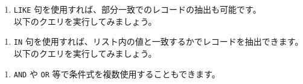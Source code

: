 \begin{enumerate}
\def\labelenumi{\arabic{enumi}.}
\setcounter{enumi}{2}
\tightlist
\item
  \texttt{LIKE} 句を使用すれば、部分一致でのレコードの抽出も可能です。\\
  以下のクエリを実行してみましょう。
\end{enumerate}

\begin{Shaded}
\begin{Highlighting}[]
 \OperatorTok{*}  \NormalTok{;}

\NormalTok{\# }\OperatorTok{{-}\textgreater{}}
\end{Highlighting}
\end{Shaded}

\begin{enumerate}
\def\labelenumi{\arabic{enumi}.}
\setcounter{enumi}{3}
\tightlist
\item
  \texttt{IN}
  句を使用すれば、リスト内の値と一致するかでレコードを抽出できます。
  以下のクエリを実行してみましょう。
\end{enumerate}

\begin{Shaded}
\begin{Highlighting}[]
 \OperatorTok{*} \NormalTok{ (}\NormalTok{, }\NormalTok{);}

\NormalTok{\# }\OperatorTok{{-}\textgreater{}}
\end{Highlighting}
\end{Shaded}

\begin{enumerate}
\def\labelenumi{\arabic{enumi}.}
\setcounter{enumi}{4}
\tightlist
\item
  \texttt{AND} や \texttt{OR} 等で条件式を複数使用することもできます。
\end{enumerate}

